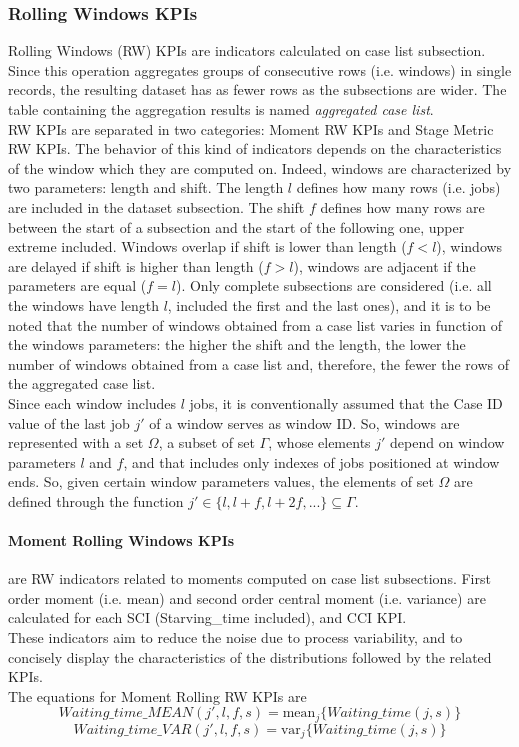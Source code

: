 \subsubsection{Rolling Windows KPIs}
Rolling Windows (RW) KPIs are indicators calculated on case list subsection. Since this operation aggregates groups of consecutive rows (i.e. windows) in single records, the resulting dataset has as fewer rows as the subsections are wider. The table containing the aggregation results is named \textit{aggregated case list}. \\ 
RW KPIs are separated in two categories: Moment RW KPIs and Stage Metric RW KPIs. The behavior of this kind of indicators depends on the characteristics of the window which they are computed on. Indeed, windows are characterized by two parameters: length and shift. The length $l$ defines how many rows (i.e. jobs) are included in the dataset subsection. The shift $f$ defines how many rows are between the start of a subsection and the start of the following one, upper extreme included. Windows overlap if shift is lower than length ($f<l$), windows are delayed if shift is higher than length ($f>l$), windows are adjacent if the parameters are equal ($f=l$). Only complete subsections are considered (i.e. all the windows have length $l$, included the first and the last ones), and it is to be noted that the number of windows obtained from a case list varies in function of the windows parameters: the higher the shift and the length, the lower the number of windows obtained from a case list and, therefore, the fewer the rows of the aggregated case list.\\
Since each window includes $l$ jobs, it is conventionally assumed that the Case ID value of the last job $j'$ of a window serves as window ID. So, windows are represented with a set $\Omega$, a subset of set $\Gamma$, whose elements $j'$ depend on window parameters $l$ and $f$, and that includes only indexes of jobs positioned at window ends. So, given certain window parameters values, the elements of set $\Omega$ are defined through the function $j'\in\{l,l+f,l+2f,...\}\subseteq\Gamma$. 
\paragraph{Moment Rolling Windows KPIs} are RW indicators related to moments computed on case list subsections. First order moment (i.e. mean) and second order central moment (i.e. variance) are calculated for each SCI (Starving\_time included), and CCI KPI. \\
These indicators aim to reduce the noise due to process variability, and to concisely display the characteristics of the distributions followed by the related KPIs. \\
The equations for Moment Rolling RW KPIs are
\[Waiting\_time\_MEAN(j',l,f,s)=\text{mean}_j\{Waiting\_time(j,s)\}\]
\[Waiting\_time\_VAR(j',l,f,s)=\text{var}_j\{Waiting\_time(j,s)\}\]

